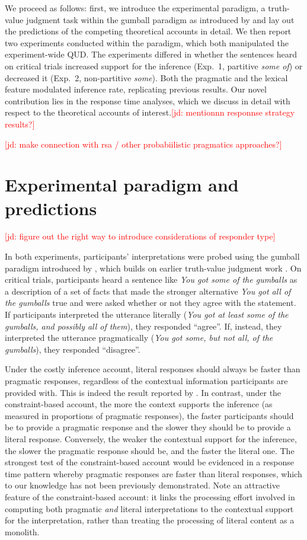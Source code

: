 \documentclass[10pt,letterpaper]{article}
\newcommand{\jd}[1]{\textcolor{Red}{[jd: #1]}}
\begin{document}
We proceed as follows: first, we introduce the experimental paradigm, a truth-value judgment task within the gumball paradigm as introduced by  and lay out the predictions of the competing theoretical accounts in detail. We then report two experiments conducted within the paradigm, which both manipulated the experiment-wide QUD. The experiments differed in whether the sentences heard on critical trials increased support for the inference (Exp.~1, partitive \emph{some of}) or decreased it (Exp.~2, non-partitive \emph{some}). Both the pragmatic and the lexical feature modulated inference rate, replicating previous results. Our  novel contribution lies in the response time analyses, which we discuss in detail with respect to the theoretical accounts of interest.\jd{mentionnn responnse strategy results?}

\jd{make connection with rsa / other probabiilistic pragmatics approaches?}

\section{Experimental paradigm and predictions}

\jd{figure out the right way to introduce considerations of responder type} 

In both experiments, participants' interpretations were probed using the gumball paradigm introduced by , which builds on earlier truth-value judgment work \cite{BottNoveck2004}. On critical trials, participants heard a sentence like \emph{You got some of the gumballs} as a description of a set of facts that made the stronger alternative \emph{You got all of the gumballs} true and were asked whether or not they agree with the statement. If participants interpreted the utterance literally (\emph{You got at least some of the gumballs, and possibly all of them}), they responded ``agree''. If, instead, they interpreted the utterance pragmatically (\emph{You got some, but not all, of the gumballs}), they responded ``disagree''. 

Under the costly inference account, literal responses should always be faster than pragmatic responses, regardless of the contextual information participants are provided with. This is indeed the result reported by . In contrast, under the constraint-based account, the more the context supports the inference (as measured in proportions of pragmatic responses), the faster participants should be to provide a pragmatic response and  the slower they should be to provide a literal response. Conversely, the weaker the contextual support for the inference, the slower the pragmatic response should be, and the faster the literal one. The strongest test of the constraint-based account would be evidenced in a response time pattern whereby pragmatic responses are faster than literal responses, which to our knowledge has not been previously demonstrated. Note an attractive feature of the constraint-based account: it links the processing effort involved in computing both pragmatic \emph{and} literal interpretations to the contextual support for the interpretation, rather than treating the processing of literal content as a monolith.
\end{document}
